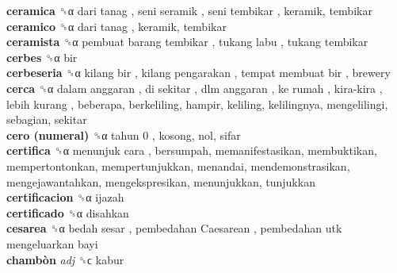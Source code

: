 \textbf{ceramica} ␝α   dari tanag ,  seni seramik ,  seni tembikar , keramik, tembikar  \\
\textbf{ceramico} ␝α   dari tanag , keramik, tembikar  \\
\textbf{ceramista} ␝α   pembuat barang tembikar ,  tukang labu ,  tukang tembikar   \\
\textbf{cerbes} ␝α  bir  \\
\textbf{cerbeseria} ␝α   kilang bir ,  kilang pengarakan ,  tempat membuat bir , brewery  \\
\textbf{cerca} ␝α   dalam anggaran ,  di sekitar ,  dlm anggaran ,  ke rumah ,  kira-kira ,  lebih kurang , beberapa, berkeliling, hampir, keliling, kelilingnya, mengelilingi, sebagian, sekitar  \\
\textbf{cero (numeral)} ␝α   tahun 0 , kosong, nol, sifar  \\
\textbf{certifica} ␝α   menunjuk cara , bersumpah, memanifestasikan, membuktikan, mempertontonkan, mempertunjukkan, menandai, mendemonstrasikan, mengejawantahkan, mengekspresikan, menunjukkan, tunjukkan  \\
\textbf{certificacion} ␝α  ijazah  \\
\textbf{certificado} ␝α  disahkan  \\
\textbf{cesarea} ␝α   bedah sesar ,  pembedahan Caesarean ,  pembedahan utk mengeluarkan bayi   \\
\textbf{chambòn} \emph{adj}  ␝ϲ  kabur  \\
